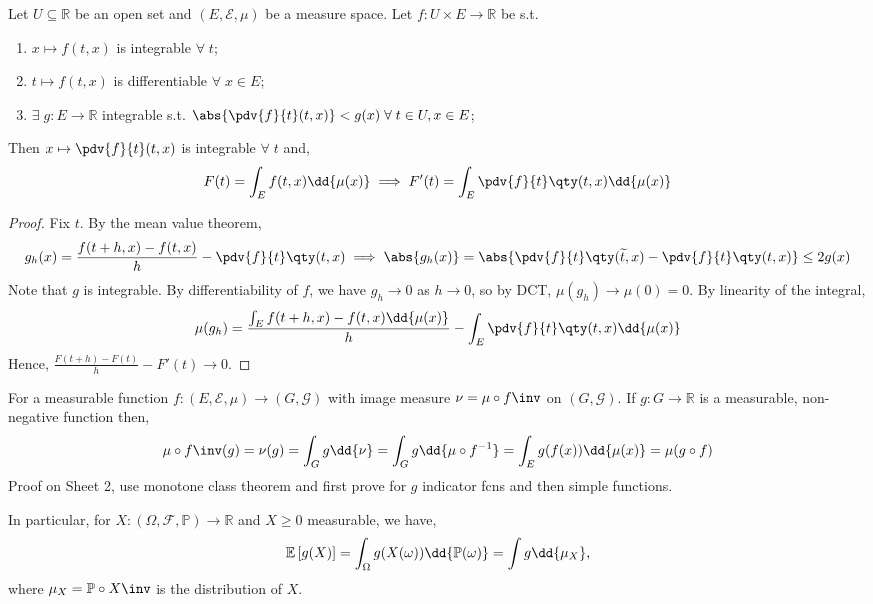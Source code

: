 \begin{theorem}
	Let $U \subseteq \mathbb R$ be an open set and $(E, \mathcal E, \mu)$ be a measure space.
	Let $f \colon U \times E \to \mathbb R$ be s.t.
	\begin{enumerate}
		\item $x \mapsto f(t, x)$ is integrable $\forall \; t$;
		\item $t \mapsto f(t,x)$ is differentiable $\forall \; x \in E$;
		\item $\exists \; g : E \to \mathbb{R}$ integrable s.t. $\abs{\pdv{f}{t}(t, x)} < g(x) \; \forall \; t \in U, x \in E$;
	\end{enumerate}
	Then $x \mapsto \pdv{f}{t}(t, x)$ is integrable $\forall \; t$ and,
	\[ F(t) = \int_E f(t,x) \dd{\mu(x)} \implies F'(t) = \int_E \pdv{f}{t}\qty(t,x) \dd{\mu(x)} \]
\end{theorem}

\begin{proof}
	Fix $t$.
	By the mean value theorem,
	\[ g_h(x) = \frac{f(t + h, x) - f(t, x)}{h} - \pdv{f}{t}\qty(t,x) \implies \abs{g_h(x)} = \abs{\pdv{f}{t}\qty(\widetilde t, x) - \pdv{f}{t}\qty(t, x)} \leq 2g(x) \]
	Note that $g$ is integrable.
	By differentiability of $f$, we have $g_h \to 0$ as $h \to 0$, so by DCT, $\mu(g_h) \to \mu(0) = 0$.
	By linearity of the integral,
	\[ \mu(g_h) = \frac{\int_E f(t + h, x) - f(t, x) \dd{\mu(x)}}{h} - \int_E \pdv{f}{t}\qty(t,x) \dd{\mu(x)} \]
	Hence, $\frac{F(t+h) - F(t)}{h} - F'(t) \to 0$.
\end{proof}

\begin{example}
	For a measurable function $f \colon (E, \mathcal E, \mu) \to (G, \mathcal G)$ with image measure $\nu = \mu \circ f\inv$ on $(G, \mathcal{G})$.
	If $g \colon G \to \mathbb R$ is a measurable, non-negative function then,
	\begin{align*}
		\mu \circ f\inv(g) = \nu(g) = \int_G g \dd{\nu} = \int_G g \dd{\mu\circ f^{-1}} = \int_E g(f(x)) \dd{\mu(x)} = \mu(g \circ f)
	\end{align*}
	Proof on Sheet 2, use monotone class theorem and first prove for $g$ indicator fcns and then simple functions.

	In particular, for $X : (\Omega, \mathcal{F}, \mathbb{P}) \to \mathbb{R}$ and $X \geq 0$ measurable, we have,
	\[ \expect{g(X)} = \int_\Omega g(X(\omega)) \dd{\mathbb P(\omega)} = \int g \dd{\mu_X}, \]
	where $\mu_X = \mathbb{P} \circ X\inv$ is the distribution of $X$.
\end{example}

